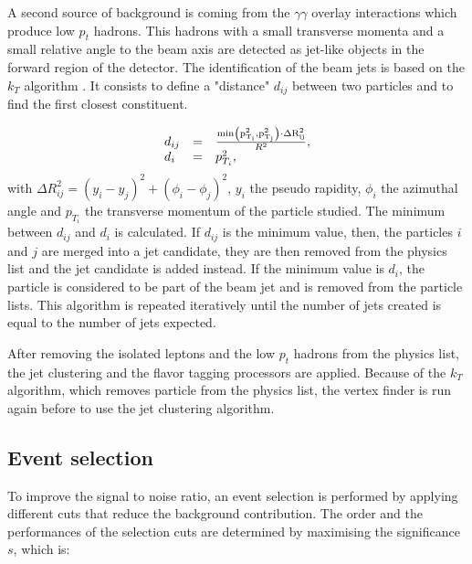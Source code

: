     A second source of background is coming from the $\gamma \gamma$ overlay interactions which produce low $p_{t}$ hadrons.
    This hadrons with a small transverse momenta and a small relative angle to the beam axis are detected as jet-like objects in the forward region of the detector.
    The identification of the beam jets is based on the $k_{T}$ algorithm \cite{Cacciari2008}.
    It consists to define a "distance" $d_{ij}$ between two particles and to find the first closest constituent.
    
    \begin{equation}
      \begin{array}{lcl}
        d_{ij} & = & \frac{\rm{min}\left(p^2_{T_i}, p^2_{T_j}\right) \cdot \Delta R^2_{ij}}{R^2}, \\
        d_{i}  & = & p^2_{T_i},
      \end{array}
    \end{equation}
    with $\Delta R^2_{ij} = \left( y_{i} - y_{j}\right)^2 + \left( \phi_{i} - \phi_{j}\right)^2$, $y_{i}$ the pseudo rapidity, $\phi_{i}$ the azimuthal angle and $p_{T_i}$ the transverse momentum of the particle studied.
    The minimum between $d_{ij}$ and $d_{i}$ is calculated.
    If $d_{ij}$ is the minimum value, then, the particles $i$ and $j$ are merged into a jet candidate, they are then removed from the physics list and the jet candidate is added instead.
    If the minimum value is $d_{i}$, the particle is considered to be part of the beam jet and is removed from the particle lists.
    This algorithm is repeated iteratively until the number of jets created is equal to the number of jets expected.
   
    After removing the isolated leptons and the low $p_{t}$ hadrons from the physics list, the jet clustering and the flavor tagging processors are applied. 
    Because of the $k_{T}$ algorithm, which removes particle from the physics list, the vertex finder is run again before to use the jet clustering algorithm.

  \subsection{Event selection}

  To improve the signal to noise ratio, an event selection is performed by applying different cuts that reduce the background contribution.
  The order and the performances of the selection cuts are determined by maximising the significance $s$, which is:

